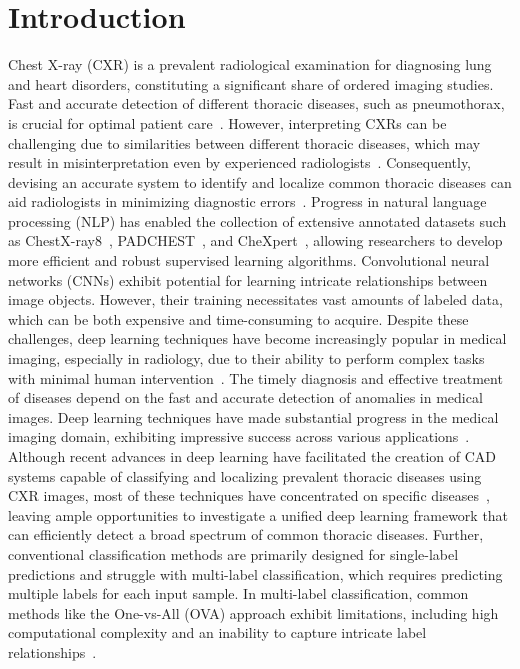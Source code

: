 \section{Introduction}\label{sec:taxonomy.introduction}
Chest X-ray (CXR) is a prevalent radiological examination for diagnosing lung and heart disorders, constituting a significant share of ordered imaging studies. Fast and accurate detection of different thoracic diseases, such as pneumothorax, is crucial for optimal patient care~\cite{bellaviti_Increased_2016}. However, interpreting CXRs can be challenging due to similarities between different thoracic diseases, which may result in misinterpretation even by experienced radiologists~\cite{delrue_Difficulties_2011}. Consequently, devising an accurate system to identify and localize common thoracic diseases can aid radiologists in minimizing diagnostic errors~\cite{crisp_Global_2014,silverstein_Most_2016}.
Progress in natural language processing (NLP) has enabled the collection of extensive annotated datasets such as ChestX-ray8~\cite{wang_ChestXRay8_2017}, PADCHEST~\cite{bustos_Padchest_2020}, and CheXpert~\cite{irvin_CheXpert_2019}, allowing researchers to develop more efficient and robust supervised learning algorithms.
Convolutional neural networks (CNNs) exhibit potential for learning intricate relationships between image objects. However, their training necessitates vast amounts of labeled data, which can be both expensive and time-consuming to acquire. Despite these challenges, deep learning techniques have become increasingly popular in medical imaging, especially in radiology, due to their ability to perform complex tasks with minimal human intervention~\cite{jaderberg_Spatial_2015}.
The timely diagnosis and effective treatment of diseases depend on the fast and accurate detection of anomalies in medical images. Deep learning techniques have made substantial progress in the medical imaging domain, exhibiting impressive success across various applications~\cite{litjens_Survey_2017a,eshghali_Machine_2023}.  Although recent advances in deep learning have facilitated the creation of CAD systems capable of classifying and localizing prevalent thoracic diseases using CXR images, most of these techniques have concentrated on specific diseases~\cite{jaiswal_Identifying_2019,lakhani_Deep_2017,pasa_Efficient_2019,ausawalaithong_Automatic_2018}, leaving ample opportunities to investigate a unified deep learning framework that can efficiently detect a broad spectrum of common thoracic diseases. Further, conventional classification methods are primarily designed for single-label predictions and struggle with multi-label classification, which requires predicting multiple labels for each input sample. In multi-label classification, common methods like the One-vs-All (OVA) approach exhibit limitations, including high computational complexity and an inability to capture intricate label relationships~\cite{tsoumakas_MultiLabel_2007}.

